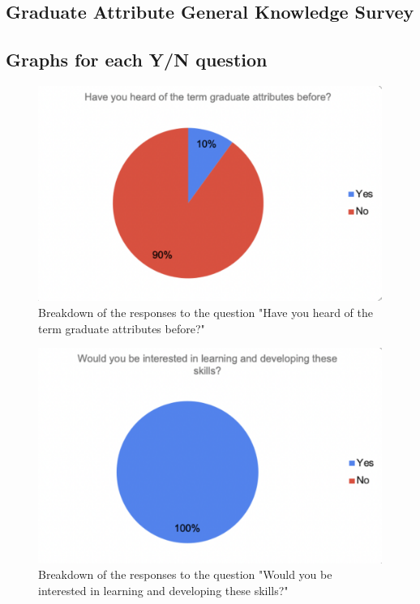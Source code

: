 \documentclass{l4proj}
\begin{document}
\begin{appendices}
\section{Graduate Attribute General Knowledge Survey} \label{Appendix-gradAttributeSurvey}

\subsection{Graphs for each Y/N question}

\begin{figure}[H]
    \begin{centering}
    \includegraphics[scale=0.5]{images/GradAttr-1.pdf}
    \caption{Breakdown of the responses to the question "Have you heard of the term graduate attributes before?"}
    \label{fig: GradAttr-1}
    \end{centering}
\end{figure}

\begin{figure}[H]
    \begin{centering}
    \includegraphics[scale=0.5]{images/GradAttr-2.pdf}
    \caption{Breakdown of the responses to the question "Would you be interested in learning and developing these skills?"}
    \label{fig: GradAttr-2}
    \end{centering}
\end{figure}


\end{appendices}
\end{document}
